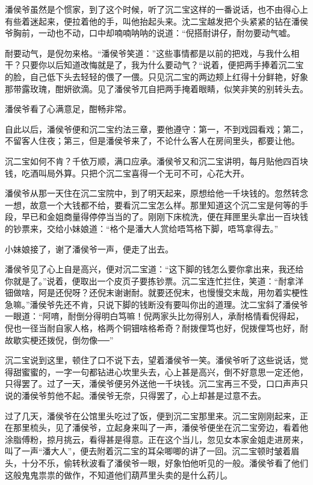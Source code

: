 \documentclass[12pt,UTF8]{ctexbook}
\begin{document}
{{{潘侯爷虽然是个惯家，到了这个时候，听了沉二宝这样的一番说话，也不由得心上有些着迷起来，便拉着他的手，叫他抬起头来。沈二宝越发把个头紧紧的钻在潘侯爷胸前，一动也不动，口中却喃喃呐呐的说道：“倪搭耐讲仔，耐勿要动气嘘。

耐要动气，是倪勿来格。“潘侯爷笑道：”这些事情都是以前的把戏，与我什么相干？只要你以后知道改悔就是了，我为什么要动气？“说着，便把两手捧着沉二宝的脸，自己低下头去轻轻的偎了一偎。只见沉二宝的两边颊上红得十分鲜艳，好象那带露玫瑰，酣妍欲滴。见了潘侯爷兀自把两手掩着眼睛，似笑非笑的别转头去。

潘侯爷看了心满意足，酣畅非常。

自此以后，潘侯爷便和沉二宝约法三章，要他遵守：第一，不到戏园看戏；第二，不留客人住夜；第三，但是潘侯爷来了，不论什么客人在房间里头，都要让他。

沉二宝如何不肯？千依万顺，满口应承。潘侯爷又和沉二宝讲明，每月贴他四百块钱，吃酒叫局外算。只把个沉二宝喜得一个无可不可，心花大开。

潘侯爷从那一天住在沉二宝院中，到了明天起来，原想给他一千块钱的。忽然转念一想，故意一个大钱都不给，要看沉二宝怎么样。那里知道这个沉二宝是何等的手段，早已和金姐商量得停停当当的了。刚刚下床梳洗，便在拜匣里头拿出一百块钱的钞票来，交给小妹娘道：“格个是潘大人赏给唔笃格下脚，唔笃拿得去。”

小妹娘接了，谢了潘侯爷一声，便走了出去。

潘侯爷见了心上自是高兴，便对沉二宝道：“这下脚的钱怎么要你拿出来，我还给你就是了。”说着，便取出一个皮页子要拣钞票。沉二宝连忙拦住，笑道：“耐拿洋钿做啥，阿是还倪呀？还倪末谢谢耐。就要还倪末，也慢慢交末哉，用勿着实梗性急嘛。”潘侯爷先还不肯，只说下脚的钱断没有要叫你出的道理。沈二宝斜了潘侯爷一眼道：“阿唷，耐倒分得明白笃嘛！倪两家头比勿得别人，承耐格情看倪得起，倪也一径当耐自家人格，格两个铜钿啥格希奇？耐拨俚笃也好，倪拨俚笃也好，耐故歇实梗还拨倪，倒勿像──”

沉二宝说到这里，顿住了口不说下去，望着潘侯爷一笑。潘侯爷听了这些说话，觉得甜蜜蜜的，一字一句都钻进心坎里头去，心上甚是高兴，倒不好意思一定还他，只得罢了。过了一天，潘侯爷便另外送他一千块钱。沉二宝再三不受，口口声声只说的潘侯爷剪他不起。潘侯爷无奈，只得罢了，心上却甚是过意不去。

过了几天，潘侯爷在公馆里头吃过了饭，便到沉二宝那里来。沉二宝刚刚起来，正在那里梳头，见了潘侯爷，立起身来叫了一声，潘侯爷便坐在沉二宝旁边，看着他涂脂傅粉，掠月挑云，看得甚是得意。正在这个当儿，忽见女本家金姐走进房来，叫了一声“潘大人”，便去附着沉二宝的耳朵唧唧的讲了一回。沉二宝顿时皱着眉头，十分不乐，偷转秋波看了潘侯爷一眼，好象怕他听见的一般。潘侯爷看了他们这般鬼鬼祟祟的做作，不知道他们葫芦里头卖的是什么药儿。

}}}
\end{document}
